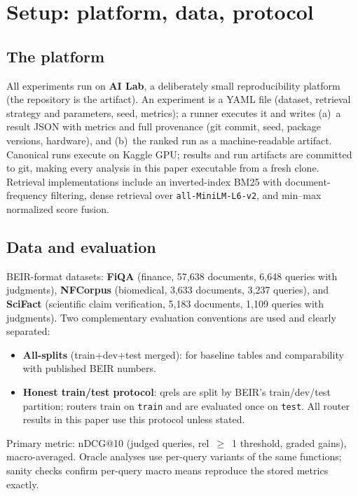 \documentclass[11pt]{article}
\begin{document}
\section{Setup: platform, data, protocol}
\subsection{The platform}
All experiments run on \textbf{AI Lab}, a deliberately small reproducibility platform (the repository is the artifact). An experiment is a YAML file (dataset, retrieval strategy and parameters, seed, metrics); a runner executes it and writes (a)~a result JSON with metrics and full provenance (git commit, seed, package versions, hardware), and (b)~the ranked run as a machine-readable artifact. Canonical runs execute on Kaggle GPU; results and run artifacts are committed to git, making every analysis in this paper executable from a fresh clone. Retrieval implementations include an inverted-index BM25 with document-frequency filtering, dense retrieval over \texttt{all-MiniLM-L6-v2}, and min--max normalized score fusion.

\subsection{Data and evaluation}
BEIR-format datasets: \textbf{FiQA} (finance, 57{,}638 documents, 6{,}648 queries with judgments), \textbf{NFCorpus} (biomedical, 3{,}633 documents, 3{,}237 queries), and \textbf{SciFact} (scientific claim verification, 5{,}183 documents, 1{,}109 queries with judgments). Two complementary evaluation conventions are used and clearly separated:
\begin{itemize}
\item \textbf{All-splits} (train+dev+test merged): for baseline tables and comparability with published BEIR numbers.
\item \textbf{Honest train/test protocol}: qrels are split by BEIR's train/dev/test partition; routers train on \texttt{train} and are evaluated once on \texttt{test}. All router results in this paper use this protocol unless stated.
\end{itemize}
Primary metric: nDCG@10 (judged queries, rel~$\geq$~1 threshold, graded gains), macro-averaged. Oracle analyses use per-query variants of the same functions; sanity checks confirm per-query macro means reproduce the stored metrics exactly.
\end{document}
